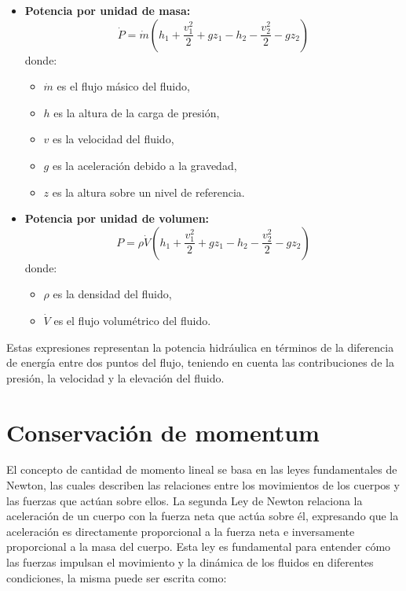 \documentclass[10pt, oneside]{article}
\begin{document}
\begin{itemize}
    \item \textbf{Potencia por unidad de masa:}
    $$
    \dot{P} = \dot{m} \left( h_1 + \frac{v_1^2}{2} + gz_1 - h_2 - \frac{v_2^2}{2} - gz_2 \right)
    $$
    donde:
    \begin{itemize}
        \item \( \dot{m} \) es el flujo másico del fluido,
        \item \( h \) es la altura de la carga de presión,
        \item \( v \) es la velocidad del fluido,
        \item \( g \) es la aceleración debido a la gravedad,
        \item \( z \) es la altura sobre un nivel de referencia.
    \end{itemize}
    
    \item \textbf{Potencia por unidad de volumen:}
    $$
    P = \rho \dot{V} \left( h_1 + \frac{v_1^2}{2} + gz_1 - h_2 - \frac{v_2^2}{2} - gz_2 \right)
    $$
    donde:
    \begin{itemize}
        \item \( \rho \) es la densidad del fluido,
        \item \( \dot{V} \) es el flujo volumétrico del fluido.
    \end{itemize}
\end{itemize}

Estas expresiones representan la potencia hidráulica en términos de la diferencia de energía entre dos puntos del flujo, teniendo en cuenta las contribuciones de la presión, la velocidad y la elevación del fluido.

\section{Conservación de momentum}

El concepto de cantidad de momento lineal se basa en las leyes fundamentales de Newton, las cuales describen las relaciones entre los movimientos de los cuerpos y las fuerzas que actúan sobre ellos.
La segunda Ley de Newton relaciona la aceleración de un cuerpo con la fuerza neta que actúa sobre él, expresando que la aceleración es directamente proporcional a la fuerza neta e inversamente proporcional a la masa del cuerpo. Esta ley es fundamental para entender cómo las fuerzas impulsan el movimiento y la dinámica de los fluidos en diferentes condiciones, la misma puede ser escrita como: 
\end{document}
